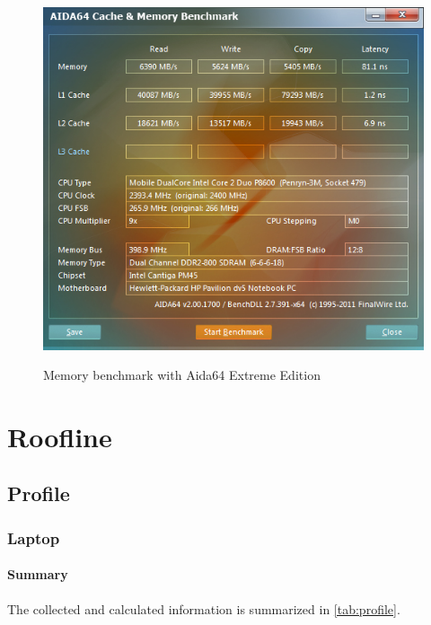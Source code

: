 \documentclass[a4paper,10pt]{report}
\begin{document}
\begin{figure}[!htp]
\includegraphics[width=12cm]{images/aida64.png}
\label{fig:aida64}
\caption[Memory benchmark]{Memory benchmark with Aida64 Extreme Edition}
\end{figure}

\chapter{Roofline}

\section{Profile}

\subsection{Laptop}

\subsubsection{Summary}

The collected and calculated information is summarized in \autoref{tab:profile}.
\end{document}
